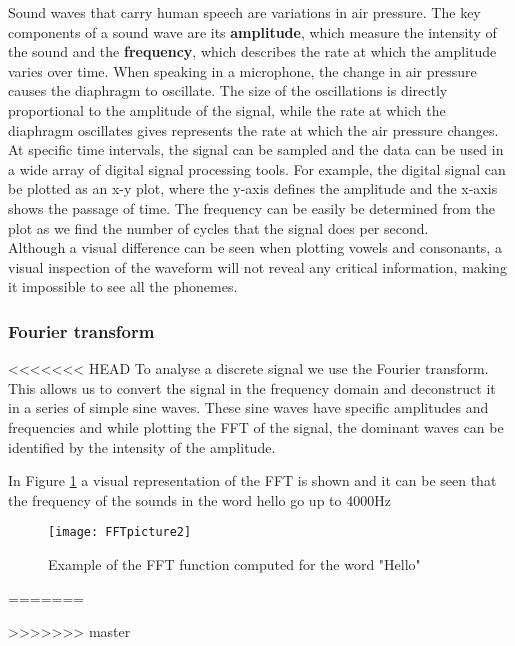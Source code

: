 Sound waves that carry human speech are variations in air pressure. The key components of a sound wave are its \textbf{amplitude}, which measure the intensity of the sound and the \textbf{frequency}, which describes the rate at which the amplitude varies over time. When speaking in a microphone, the change in air pressure causes the diaphragm to oscillate. The size of the oscillations is directly proportional to the amplitude of the signal, while the rate at which the diaphragm oscillates gives represents the rate at which the air pressure changes. At specific time intervals, the signal can be sampled and the data can be used in a wide array of digital signal processing tools. For example, the digital signal can be plotted as an x-y plot, where the y-axis defines the amplitude and the x-axis shows the passage of time. The frequency can be easily be determined from the plot as we find the number of cycles that the signal does per second.\\

Although a visual difference can be seen when plotting vowels and consonants, a visual inspection of the waveform will not reveal any critical information, making it impossible to see all the phonemes.\\

\subsubsection{ Fourier transform}

<<<<<<< HEAD
To analyse a discrete signal we use the Fourier transform. This allows us to convert the signal in the frequency domain and deconstruct it in a series of simple sine waves. These sine waves have specific amplitudes and frequencies and while plotting the FFT of the signal, the dominant waves can be identified by the intensity of the amplitude.

In Figure \ref{fig:FFT} a visual representation of the FFT is shown and it can be seen that the frequency of the sounds in the word hello go up to 4000Hz 
\begin{figure}
\texttt{[image: FFTpicture2]}
\centering
\caption{Example of the FFT function computed for the word "Hello"}
\label{fig:FFT}
\end{figure}
=======




>>>>>>> master

